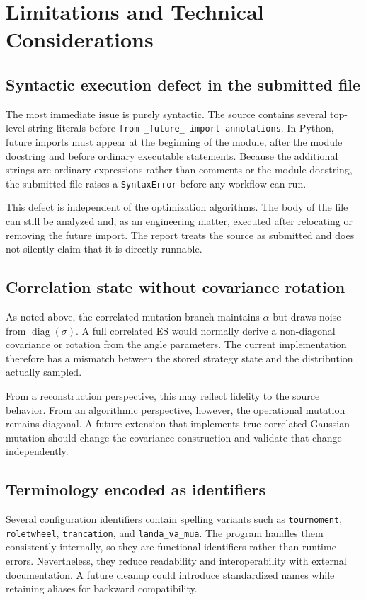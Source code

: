 \documentclass[11pt,a4paper]{article}
\newcommand{\code}[1]{\texttt{#1}}
\newcommand{\diag}{\operatorname{diag}}
\begin{document}
\section{Limitations and Technical Considerations}
\subsection{Syntactic execution defect in the submitted file}
The most immediate issue is purely syntactic. The source contains several top-level string literals before \code{from \_future\_ import annotations}. In Python, future imports must appear at the beginning of the module, after the module docstring and before ordinary executable statements. Because the additional strings are ordinary expressions rather than comments or the module docstring, the submitted file raises a \code{SyntaxError} before any workflow can run.

This defect is independent of the optimization algorithms. The body of the file can still be analyzed and, as an engineering matter, executed after relocating or removing the future import. The report treats the source as submitted and does not silently claim that it is directly runnable.

\subsection{Correlation state without covariance rotation}
As noted above, the correlated mutation branch maintains $\alpha$ but draws noise from $\diag(\sigma)$. A full correlated ES would normally derive a non-diagonal covariance or rotation from the angle parameters. The current implementation therefore has a mismatch between the stored strategy state and the distribution actually sampled.

From a reconstruction perspective, this may reflect fidelity to the source behavior. From an algorithmic perspective, however, the operational mutation remains diagonal. A future extension that implements true correlated Gaussian mutation should change the covariance construction and validate that change independently.

\subsection{Terminology encoded as identifiers}
Several configuration identifiers contain spelling variants such as \code{tournoment}, \code{roletwheel}, \code{trancation}, and \code{landa\_va\_mua}. The program handles them consistently internally, so they are functional identifiers rather than runtime errors. Nevertheless, they reduce readability and interoperability with external documentation. A future cleanup could introduce standardized names while retaining aliases for backward compatibility.
\end{document}
